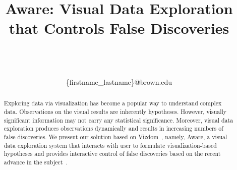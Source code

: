 \documentclass{sig}
\newcommand{\system}{{\sc Aware}}
\begin{document}
\title{Aware: Visual Data Exploration that Controls False Discoveries}

\author{
\alignauthor
\begin{tabular}{cccc}
\end{tabular}\\
\\
\{firstname\_lastname\}@brown.edu
}

\date{}
\maketitle

\begin{abstract}
Exploring data via visualization has become a popular way to understand complex data. Observations on the visual results are inherently hypotheses.  However, visually significant information may not carry any statistical significance. Moreover, visual data exploration produces observations dynamically and results in increasing numbers of false discoveries.  We present our solution based on Vizdom~\cite{vizdom}, namely, \system{}, a visual data exploration system that interacts with user to formulate visualization-based hypotheses and provides interactive control of false discoveries based on the recent advance in the subject~\cite{controlling-false-discoveries}.
\end{abstract}











\balance
\begin{scriptsize}


\end{scriptsize}
\end{document}

